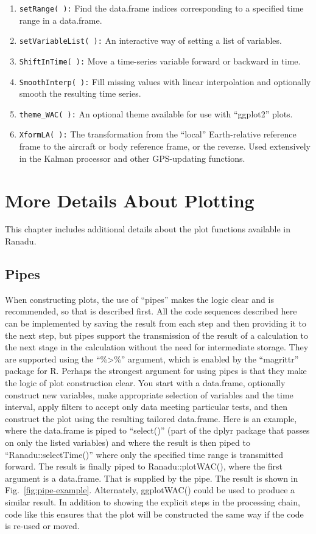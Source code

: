 \documentclass[12pt,english]{report}\usepackage[]{graphicx}\usepackage[]{color}
\begin{document}
\begin{enumerate}
\item \texttt{setRange( ):} Find the data.frame indices corresponding to
a specified time range in a data.frame.
\item \texttt{setVariableList( ):} An interactive way of setting a list
of variables.
\item \texttt{ShiftInTime( ):} Move a time-series variable forward or backward
in time.
\item \texttt{SmoothInterp( ):} Fill missing values with linear interpolation
and optionally smooth the resulting time series.
\item \texttt{theme\_WAC( ):} An optional theme available for use with ``ggplot2''
plots.
\item \texttt{XformLA( ):} The transformation from the ``local'' Earth-relative
reference frame to the aircraft or body reference frame, or the reverse.
Used extensively in the Kalman processor and other GPS-updating functions.
\end{enumerate}

\chapter{More Details About Plotting}

This chapter includes additional details about the plot functions
available in Ranadu.

\section{Pipes}

When constructing plots, the use of ``pipes'' makes the logic clear
and is recommended, so that is described first. All the code sequences
described here can be implemented by saving the result from each step
and then providing it to the next step, but pipes support the transmission
of the result of a calculation to the next stage in the calculation
without the need for intermediate storage. They are supported using
the ``\%>\%'' argument, which is enabled by the ``magrittr'' package
for R\@. Perhaps the strongest argument for using pipes is that they
make the logic of plot construction clear. You start with a data.frame,
optionally construct new variables, make appropriate selection of
variables and the time interval, apply filters to accept only data
meeting particular tests, and then construct the plot using the resulting
tailored data.frame. Here is an example, where the data.frame is piped
to ``select()'' (part of the dplyr package that passes on only the
listed variables) and where the result is then piped to ``Ranadu::selectTime()''
where only the specified time range is transmitted forward. The result
is finally piped to Ranadu::plotWAC(), where the first argument is
a data.frame. That is supplied by the pipe. The result is shown in
Fig.~\ref{fig:pipe-example}. Alternately, ggplotWAC() could be used
to produce a similar result. In addition to showing the explicit steps
in the processing chain, code like this ensures that the plot will
be constructed the same way if the code is re-used or moved.
\end{document}
